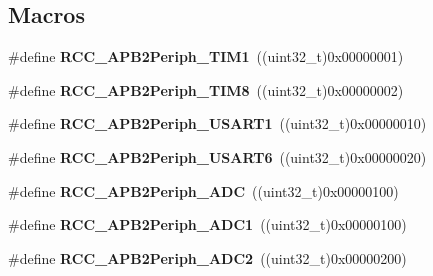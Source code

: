 \subsection*{Macros}
\begin{DoxyCompactItemize}
\item 
\mbox{\label{group___r_c_c___a_p_b2___peripherals_ga0d9babf212897db0b3aa852f8a71160b}} 
\#define {\bfseries R\+C\+C\+\_\+\+A\+P\+B2\+Periph\+\_\+\+T\+I\+M1}~((uint32\+\_\+t)0x00000001)
\item 
\mbox{\label{group___r_c_c___a_p_b2___peripherals_gac951d41a08140a7d38a4faff8dd1e03e}} 
\#define {\bfseries R\+C\+C\+\_\+\+A\+P\+B2\+Periph\+\_\+\+T\+I\+M8}~((uint32\+\_\+t)0x00000002)
\item 
\mbox{\label{group___r_c_c___a_p_b2___peripherals_ga14e1b3b6d84801c223a37a954b5b1910}} 
\#define {\bfseries R\+C\+C\+\_\+\+A\+P\+B2\+Periph\+\_\+\+U\+S\+A\+R\+T1}~((uint32\+\_\+t)0x00000010)
\item 
\mbox{\label{group___r_c_c___a_p_b2___peripherals_ga586a356ab3be48b90abd4b40360ab78d}} 
\#define {\bfseries R\+C\+C\+\_\+\+A\+P\+B2\+Periph\+\_\+\+U\+S\+A\+R\+T6}~((uint32\+\_\+t)0x00000020)
\item 
\mbox{\label{group___r_c_c___a_p_b2___peripherals_ga0057230e73c654bb9f7e18d8cf76b29e}} 
\#define {\bfseries R\+C\+C\+\_\+\+A\+P\+B2\+Periph\+\_\+\+A\+DC}~((uint32\+\_\+t)0x00000100)
\item 
\mbox{\label{group___r_c_c___a_p_b2___peripherals_gacd24acb2cd5ca208652157f6c13d3145}} 
\#define {\bfseries R\+C\+C\+\_\+\+A\+P\+B2\+Periph\+\_\+\+A\+D\+C1}~((uint32\+\_\+t)0x00000100)
\item 
\mbox{\label{group___r_c_c___a_p_b2___peripherals_ga4fd76e573e827702568d6064e33448b5}} 
\#define {\bfseries R\+C\+C\+\_\+\+A\+P\+B2\+Periph\+\_\+\+A\+D\+C2}~((uint32\+\_\+t)0x00000200)
\item 
\mbox{\label{group___r_c_c___a_p_b2___peripherals_ga371d55bbf17bf965a213c59f2d276d72}} 

\end{DoxyCompactItemize}
